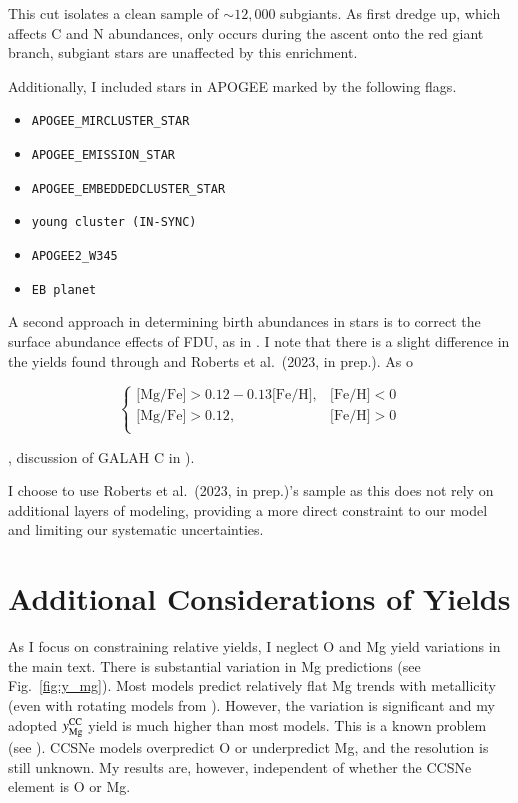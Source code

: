 \documentclass[12pt,oneside]{report}
\newcommand{\Yoc}{\ensuremath{y_{\rm Mg}^{\rm CC}}}
\newcommand{\citetjack}{Roberts et al.~(2023, in prep.)}
\newcommand{\about}[1]{${\sim} #1$}
\begin{document}
This cut isolates a clean sample of \about{12,000} subgiants. As first dredge up, which affects C and N abundances, only occurs during the ascent onto the red giant branch, subgiant stars are unaffected by this enrichment. 

Additionally, I included stars in APOGEE marked by the following flags.
\begin{itemize}
\item \verb|APOGEE_MIRCLUSTER_STAR|
\item \verb|APOGEE_EMISSION_STAR|
\item \verb|APOGEE_EMBEDDEDCLUSTER_STAR|
\item \verb|young cluster (IN-SYNC)|
\item \verb|APOGEE2_W345|
\item \verb|EB planet|
\end{itemize}

A second approach in determining birth abundances in stars is to correct the surface abundance effects of FDU, as in \cite{vincenzo+21}. I note that there is a slight difference in the yields found through \cite{vincenzo+21} and \citetjack. As o

\begin{equation}\label{eq:high_alpha}
\begin{cases}
\text{[Mg/Fe]} >0.12-0.13\text{[Fe/H]}, & \text{[Fe/H]}<0\\
\text{[Mg/Fe]} >0.12, & \text{[Fe/H]}>0\\
\end{cases}
\end{equation}

, discussion of GALAH C in \citealt{emily+19}).


I choose to use \citetjack's sample as this does not rely on additional layers of modeling, providing a more direct constraint to our model and limiting our systematic uncertainties.

\newpage
\section{Additional Considerations of Yields}\label{sec:alt_agb}

As I focus on constraining relative yields, I neglect O and Mg yield variations in the main text. There is substantial variation in Mg predictions (see Fig.~\ref{fig:y_mg}). Most models predict relatively flat Mg trends with metallicity (even with rotating models from \citealt{LC18}). However, the variation is significant and my adopted $\Yoc$ yield is much higher than most models. This is a known problem (see \citet{emily+21}). CCSNe models overpredict O or underpredict Mg, and the resolution is still unknown. 
My results are, however, independent of whether the CCSNe element is O or Mg.
\end{document}
